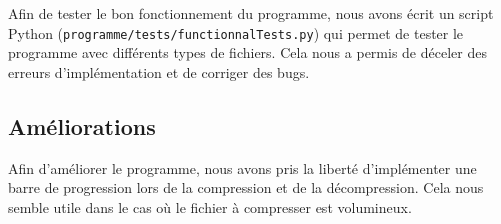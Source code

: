 Afin de tester le bon fonctionnement du programme, nous avons écrit un script Python (\texttt{programme/tests/functionnalTests.py}) qui permet de tester le programme avec différents types de fichiers.
Cela nous a permis de déceler des erreurs d'implémentation et de corriger des bugs.

\subsection{Améliorations}

Afin d'améliorer le programme, nous avons pris la liberté d'implémenter une barre de progression lors de la compression et de la décompression.
Cela nous semble utile dans le cas où le fichier à compresser est volumineux.